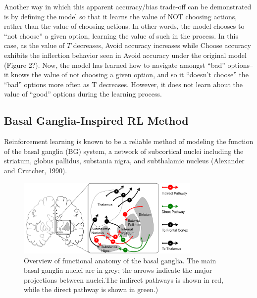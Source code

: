 \documentclass[10pt,letterpaper]{article}
\begin{document}
Another way in which this apparent accuracy/bias trade-off can be demonstrated is by defining the model so that it learns the value of NOT choosing actions, rather than the value of choosing actions. In other words, the model chooses to ``not choose'' a given option, learning the value of such in the process. In this case, as the value of $T$ decreases, Avoid accuracy increases while Choose accuracy exhibits the inflection behavior seen in Avoid accuracy under the original model (Figure 2?). Now, the model has learned how to navigate amongst ``bad'' options--it knows the value of not choosing a given option, and so it ``doesn’t choose'' the ``bad'' options more often as T  decreases. However, it does not learn about the value of ``good'' options during the learning process.

\subsection{Basal Ganglia-Inspired RL Method}

Reinforcement learning is known to be a reliable method of modeling the function of the basal ganglia (BG) system, a network of subcortical nuclei including the striatum, globus pallidus, substania nigra, and subthalamic nucleus (Alexander and Crutcher, 1990).

\begin{figure}[ht]
	\begin{center}
		\includegraphics[width=3.5in]{basal-ganglia.png}
	\end{center}
	\caption{Overview of functional anatomy of the basal ganglia. The main basal ganglia nuclei are in grey; the arrows indicate the major projections between nuclei.The indirect pathways is shown in red, while the direct pathway is shown in green.)} 
	\label{bg}
\end{figure}
\end{document}
